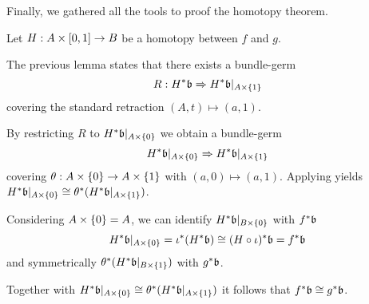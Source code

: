 \begin{myparagraph}
    Finally, we gathered all the tools to proof the homotopy theorem.
\end{myparagraph}

\begin{myproof}
    Let $H: A \times{} [0, 1] \to B$ be a homotopy between $f$ and $g$.

    The previous lemma states that there exists a bundle-germ
    \[ R: H^*\mathfrak{b} \Rightarrow{} H^*\mathfrak{b}\vert_{A \times{} \{1\}} \]
    covering the standard retraction $(A, t) \mapsto (a, 1)$.

    By restricting $R$ to $H^*\mathfrak{b}\vert_{A \times{} \{0\}}$ we obtain a bundle-germ
    \[ H^*\mathfrak{b}\vert_{A \times{} \{0\}} \Rightarrow{} H^*\mathfrak{b}\vert_{A \times{} \{1\}} \]
    covering $\theta: A \times{} \{0\} \to A \times{} \{1\}$ with $(a, 0) \mapsto (a, 1)$.
    Applying  yields $H^*\mathfrak{b}\vert_{A \times{} \{0\}} \cong \theta^*(H^*\mathfrak{b}\vert_{A \times{} \{1\}})$.

    Considering $A \times{} \{0\} = A$, we can identify $H^*\mathfrak{b}\vert_{B \times{} \{0\}}$ with $f^*\mathfrak{b}$
    \[ H^*\mathfrak{b}\vert_{A \times \{0\}} = \iota^*(H^*\mathfrak{b}) \cong (H \circ \iota)^*\mathfrak{b} = f^*\mathfrak{b} \]
    and symmetrically $\theta^*(H^*\mathfrak{b}\vert_{B \times{} \{1\}})$ with $g^*\mathfrak{b}$.

    Together with $H^*\mathfrak{b}\vert_{A \times{} \{0\}} \cong \theta^*(H^*\mathfrak{b}\vert_{A \times{} \{1\}})$ it follows that $f^*\mathfrak{b} \cong g^*\mathfrak{b}$.
\end{myproof}